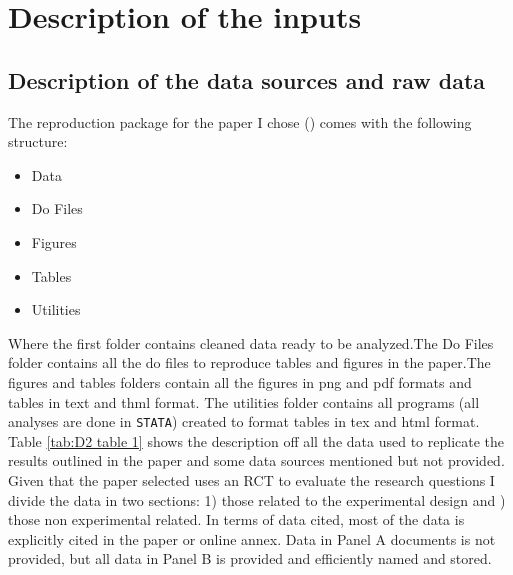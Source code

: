 \documentclass{article}
\begin{document}
\maketitle

\section{Description of the inputs}

\subsection{Description of the data sources and raw data} \label{description data}


The reproduction package for the paper I chose (\cite{abebe2021anonymity}) comes with the following structure:

\begin{itemize}
    \item Data
    \item Do Files
    \item Figures
    \item Tables
    \item Utilities
\end{itemize}

Where the first folder contains cleaned data ready to be analyzed.The Do Files folder contains all the do files to reproduce tables and figures in the paper.The figures and tables folders contain all the figures in png and pdf formats and tables in text and thml format. The utilities folder contains all programs (all analyses are done in \texttt{STATA}) created to format tables in tex and html format. Table \ref{tab:D2 table 1} shows the description off all the data used to replicate the results outlined in the paper and some data sources mentioned but not provided. Given that the paper selected uses an RCT to evaluate the research questions I divide the data in two sections: 1) those related to the experimental design and ) those non experimental related. In terms of data cited, most of the data is explicitly cited in the paper or online annex. Data in Panel A documents is not provided, but all data in Panel B is provided and efficiently named and stored.
\end{document}
